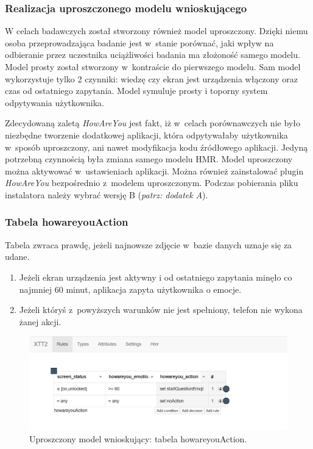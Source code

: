 \subsubsection{Realizacja uproszczonego modelu wnioskującego}

W celach badawczych został stworzony również model uproszczony. Dzięki niemu osoba przeprowadzająca badanie jest w~stanie porównać, jaki wpływ na odbieranie przez uczestnika uciążliwości badania ma złożoność samego modelu. Model prosty został stworzony w~kontraście do pierwszego modelu. Sam model wykorzystuje tylko 2 czynniki: wiedzę czy ekran jest urządzenia włączony oraz czas od ostatniego zapytania. Model  symuluje prosty i toporny system odpytywania użytkownika. 

Zdecydowaną zaletą \textit{HowAreYou} jest fakt, iż w~celach porównawczych nie było niezbędne tworzenie dodatkowej aplikacji, która odpytywałaby użytkownika w~sposób uproszczony, ani nawet modyfikacja kodu źródłowego aplikacji. Jedyną potrzebną czynnością była zmiana samego modelu HMR. Model uproszczony można aktywować w~ustawieniach aplikacji. Można również zainstalować plugin \textit{HowAreYou} bezpośrednio z~modelem uproszczonym. Podczas pobierania pliku instalatora należy wybrać wersję B (\textit{patrz: dodatek A}).


\subsubsection{Tabela howareyouAction}

Tabela zwraca prawdę, jeżeli najnowsze zdjęcie w~bazie danych uznaje się za udane. 
\begin{enumerate}
	\item Jeżeli ekran urządzenia jest aktywny i od ostatniego zapytania minęło co najmniej 60 minut, aplikacja zapyta użytkownika o emocje.
	\item Jeżeli któryś z~powyższych warunków nie jest spełniony, telefon nie wykona żanej akcji.
\end{enumerate}

\begin{figure}[H]
	\centering
	\includegraphics[scale=0.8]{rozdzial4/HMR_basic.png}
	\caption{Uproszczony model wnioskujący: tabela howareyouAction.}
\end{figure}

